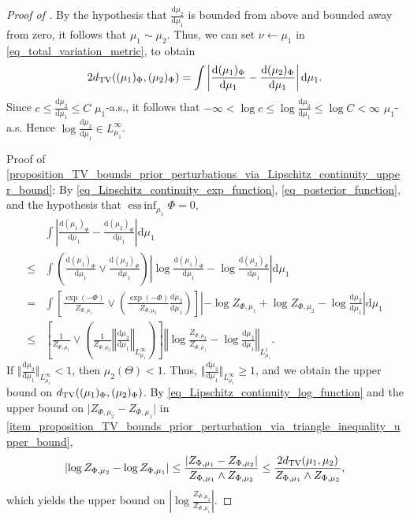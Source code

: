 \documentclass[a4paper]{scrartcl}
\theoremstyle{definition}
\numberwithin{equation}{section}
\newcommand{\rd}{\mathrm{d}}
\DeclareMathOperator*{\essinf}{ess\,inf}
\newcommand{\abs}[1]{\vert #1\vert}
\newcommand{\Abs}[1]{\left\vert#1\right\vert}
\newcommand{\norm}[1]{\Vert #1 \Vert}
\newcommand{\Norm}[1]{\left\Vert #1 \right\Vert}
\newcommand{\TV}[0]{\textup{TV}}
\begin{document}
\TVboundsPriorperturbationLipschitz*
\begin{proof}[Proof of ]
By the hypothesis that $\tfrac{\rd\mu_2}{\rd\mu_1}$ is bounded from above and bounded away from zero, it follows that $\mu_1\sim\mu_2$.
Thus, we can set $\nu\leftarrow \mu_1$ in \eqref{eq_total_variation_metric}, to obtain
\begin{equation*}
  2d_{\TV}((\mu_1)_\Phi,(\mu_2)_\Phi)= \int\Abs{\frac{\rd (\mu_1)_\Phi}{\rd \mu_1}-\frac{\rd (\mu_2)_\Phi}{\rd \mu_1}} \rd \mu_1 .
\end{equation*}
Since $c\leq \tfrac{\rd\mu_2}{\rd\mu_1}\leq C$ $\mu_1$-a.s., it follows that $-\infty<\log c\leq \log \tfrac{\rd\mu_2}{\rd\mu_1}\leq \log C<\infty$ $\mu_1$-a.s.
Hence $\log \tfrac{\rd\mu_2}{\rd\mu_1}\in L^\infty_{\mu_1}$.

Proof of \cref{proposition_TV_bounds_prior_perturbations_via_Lipschitz_continuity_upper_bound}: By \eqref{eq_Lipschitz_continuity_exp_function}, \eqref{eq_posterior_function}, and the hypothesis that $\essinf_{\mu_1}\Phi=0$,
\begin{align*}
&\int\Abs{\frac{\rd (\mu_1)_\Phi}{\rd \mu_1}-\frac{\rd (\mu_2)_\Phi}{\rd \mu_1}} \rd \mu_1 
  \\
  \leq & \int \left(\frac{\rd (\mu_1)_\Phi}{\rd \mu_1}\vee \frac{\rd (\mu_2)_\Phi}{\rd \mu_1} \right)\Abs{\log \frac{\rd (\mu_1)_\Phi}{\rd \mu_1}-\log\frac{\rd (\mu_2)_\Phi}{\rd \mu_1}} \rd \mu_1
  \\
  =& \int \left[\frac{\exp(-\Phi)}{Z_{\Phi,\mu_1}}\vee \left(\frac{\exp(-\Phi)}{Z_{\Phi,\mu_2}}\frac{\rd\mu_2}{\rd \mu_1} \right)\right]\Abs{-\log Z_{\Phi,\mu_1}+\log Z_{\Phi,\mu_2}-\log\frac{\rd \mu_2}{\rd \mu_1}} \rd \mu_1 
  \\
  \leq & \left[\frac{1}{Z_{\Phi,\mu_1}}\vee \left(\frac{1}{Z_{\Phi,\mu_2}}\Norm{\frac{\rd\mu_2}{\rd \mu_1}}_{L^\infty_{\mu_1}} \right)\right]\Norm{\log \frac{Z_{\Phi,\mu_2}}{Z_{\Phi,\mu_1}}-\log\frac{\rd \mu_2}{\rd \mu_1} }_{L^1_{\mu_1}}.
\end{align*}
If $\norm{\frac{\rd\mu_2}{\rd \mu_1}}_{L^\infty_{\mu_1}}< 1$, then $\mu_2(\Theta)<1$. Thus, $\norm{\frac{\rd\mu_2}{\rd \mu_1}}_{L^\infty_{\mu_1}}\geq  1$, and we obtain the upper bound on $d_{\TV}((\mu_1)_\Phi,(\mu_2)_\Phi)$.
By \eqref{eq_Lipschitz_continuity_log_function} and the upper bound on $\abs{Z_{\Phi,\mu_2}-Z_{\Phi,\mu_1}}$ in \ref{item_proposition_TV_bounds_prior_perturbation_via_triangle_inequality_upper_bound},
\begin{equation*}
\Abs{\log Z_{\Phi,\mu_2}-\log Z_{\Phi,\mu_1}}\leq \frac{\Abs{Z_{\Phi,\mu_1}-Z_{\Phi,\mu_2}}}{Z_{\Phi,\mu_1}\wedge Z_{\Phi,\mu_2}}\leq\frac{2d_{\TV}(\mu_1,\mu_2)}{Z_{\Phi,\mu_1}\wedge Z_{\Phi,\mu_2}},
\end{equation*}
which yields the upper bound on $\Abs{\log \tfrac{Z_{\Phi,\mu_2}}{Z_{\Phi,\mu_1}}}$.


\end{proof}
\end{document}

